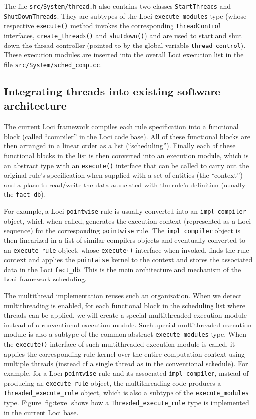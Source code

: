 \documentclass{article}
\begin{document}
The file \texttt{src/System/thread.h} also contains two classes
\lstinline{StartThreads} and \lstinline{ShutDownThreads}.  They are
subtypes of the Loci \lstinline{execute_modules} type (whose respective
\lstinline{execute()} method invokes the corresponding
\lstinline{ThreadControl} interfaces, \lstinline{create_threads()} and
\lstinline{shutdown()}) and are used to
start and shut down the thread controller (pointed to by the global
variable \lstinline{thread_control}).  These execution modules are
inserted into the overall Loci execution list in the file
\texttt{src/System/sched\_comp.cc}.

\subsection{Integrating threads into existing software architecture}
\label{sec:int}
The current Loci framework compiles each rule specification into a
functional block (called ``compiler'' in the Loci code base).  All of
these functional blocks are then arranged in a linear order as a list
(``scheduling'').  Finally each of these functional blocks in the list is
then converted into an execution module, which is an abstract type with
an \lstinline{execute()} interface that can be called to carry out the
original rule's specification when supplied with a set of entities (the
``context'') and a place to read/write the data associated with the
rule's definition (usually the \lstinline{fact_db}).  

For example, a
Loci \lstinline{pointwise} rule is usually converted into an
\lstinline{impl_compiler} object, which when called, generates the
execution context (represented as a Loci sequence) for the corresponding
\lstinline{pointwise} rule.  The \lstinline{impl_compiler} object is
then linearized in a list of similar compilers objects and eventually
converted to an \lstinline{execute_rule} object, whose
\lstinline{execute()} interface when invoked, finds the rule context and
applies the \lstinline{pointwise} kernel to the context and stores the
associated data in the Loci \lstinline{fact_db}.  This is the main
architecture and mechanism of the Loci framework scheduling.

The multithread implementation reuses such an organization.  When we
detect multithreading is enabled, for each functional block in the
scheduling list where threads can be applied, we will create a special
multithreaded execution module instead of a conventional execution module.
Such special multithreaded execution module is also a subtype of the
common abstract \lstinline{execute_modules} type.  When the
\lstinline{execute()} interface of such multithreaded execution module
is called, it applies the corresponding rule kernel over the entire
computation context using multiple threads (instead of a single thread
as in the conventional schedule).  For example, for a Loci
\lstinline{pointwise} rule and its associated \lstinline{impl_compiler},
instead of producing an \lstinline{execute_rule} object, the
multithreading code produces a \lstinline{Threaded_execute_rule} object,
which is also a subtype of the \lstinline{execute_modules} type.
Figure \ref{fig:texe} shows how a \lstinline{Threaded_execute_rule}
type is implemented in the current Loci base.
\end{document}
